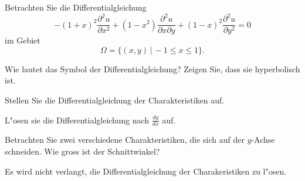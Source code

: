 Betrachten Sie die Differentialgleichung
\[
-(1+x)^2\frac{\partial^2u}{\partial x^2}
+(1-x^2)\frac{\partial^2u}{\partial x\partial y}
+(1-x)^2\frac{\partial^2u}{\partial y^2}=0
\]
im Gebiet
\[
\Omega=\{(x,y)\,|\, -1\le x \le 1\}.
\]
\begin{teilaufgaben}
\item Wie lautet das Symbol der Differentialgleichung? Zeigen Sie, dass sie
hyperbolisch ist.
\item Stellen Sie die Differentialgleichung der Charakteristiken auf.
\item L"osen sie die Differentialgleichung nach $\frac{dy}{dx}$ auf.
\item Betrachten Sie zwei verschiedene Charakteristiken, die sich
auf der $y$-Achse schneiden. Wie gross ist der Schnittwinkel?
\end{teilaufgaben}

\begin{hinweis}
Es wird nicht verlangt, die Differentialgleichung
der Charakeristiken zu l"osen.
\end{hinweis}

